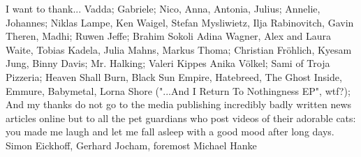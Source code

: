 I want to thank...
Vadda; Gabriele; Nico, Anna, Antonia, Julius; Annelie, Johannes;
%
Niklas Lampe, Ken Waigel, Stefan Mysliwietz, Ilja Rabinovitch, Gavin Theren,
Madhi; Ruwen Jeffe; Brahim Sokoli
Adina Wagner, Alex and Laura Waite, Tobias Kadela, Julia Mahns, Markus Thoma;
Christian Fröhlich, Kyesam Jung, Binny Davis;
Mr. Halking; Valeri Kippes
Anika Völkel;
Sami of Troja Pizzeria;
Heaven Shall Burn, Black Sun Empire, Hatebreed, The Ghost Inside, Emmure,
Babymetal, Lorna Shore ("...And I Return To Nothingness EP", wtf?);
%
And my thanks do not go to the media publishing incredibly badly written news
articles online but to all the pet guardians who post videos of their adorable
cats: you made me laugh and let me fall asleep with a good mood after long
days.
Simon Eickhoff, Gerhard Jocham, foremost Michael Hanke
%

